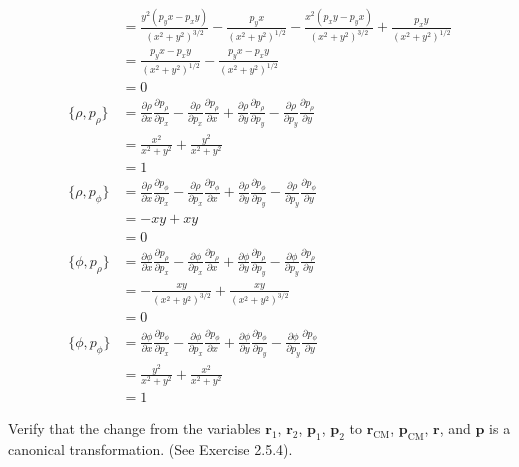 \documentclass[../principles-of-quantum-mechanics.tex]{subfiles}
\begin{document}
\begin{questions}
\begin{solution}
\begin{align*}
				&= \frac{y^2(p_yx - p_xy)}{(x^2+y^2)^{3/2}} - \frac{p_yx}{(x^2+y^2)^{1/2}} - \frac{x^2(p_xy - p_yx)}{(x^2+y^2)^{3/2}} + \frac{p_xy}{(x^2+y^2)^{1/2}} \\
				&= \frac{p_yx-p_xy}{(x^2+y^2)^{1/2}} - \frac{p_yx - p_xy}{(x^2+y^2)^{1/2}} \\
				&= 0 \\
				\{\rho, p_\rho\} &= \frac{\partial \rho}{\partial{x}}\frac{\partial p_\rho}{\partial p_x} - \frac{\partial \rho}{\partial{p_x}}\frac{\partial p_\rho}{\partial x} + \frac{\partial \rho}{\partial{y}}\frac{\partial p_\rho}{\partial p_y} - \frac{\partial \rho}{\partial{p_y}}\frac{\partial p_\rho}{\partial y} \\
				&= \frac{x^2}{x^2+y^2} + \frac{y^2}{x^2 + y^2} \\
				&= 1 \\
				\{\rho, p_\phi\} &= \frac{\partial \rho}{\partial{x}}\frac{\partial p_\phi}{\partial p_x} - \frac{\partial \rho}{\partial{p_x}}\frac{\partial p_\phi}{\partial x} + \frac{\partial \rho}{\partial{y}}\frac{\partial p_\phi}{\partial p_y} - \frac{\partial \rho}{\partial{p_y}}\frac{\partial p_\phi}{\partial y} \\
				&= -xy + xy \\
				&= 0 \\
				\{\phi, p_\rho\} &= \frac{\partial \phi}{\partial{x}}\frac{\partial p_\rho}{\partial p_x} - \frac{\partial \phi}{\partial{p_x}}\frac{\partial p_\rho}{\partial x} + \frac{\partial \phi}{\partial{y}}\frac{\partial p_\rho}{\partial p_y} - \frac{\partial \phi}{\partial{p_y}}\frac{\partial p_\rho}{\partial y} \\
				&= -\frac{xy}{(x^2+y^2)^{3/2}} + \frac{xy}{(x^2+y^2)^{3/2}} \\
				&= 0 \\
				\{\phi, p_\phi\} &= \frac{\partial \phi}{\partial{x}}\frac{\partial p_\phi}{\partial p_x} - \frac{\partial \phi}{\partial{p_x}}\frac{\partial p_\phi}{\partial x} + \frac{\partial \phi}{\partial{y}}\frac{\partial p_\phi}{\partial p_y} - \frac{\partial \phi}{\partial{p_y}}\frac{\partial p_\phi}{\partial y} \\
				&= \frac{y^2}{x^2+y^2} + \frac{x^2}{x^2+y^2} \\
				&= 1
			\end{align*}
		\end{solution}
		
		\question Verify that the change from the variables $\mathbf{r}_1$, $\mathbf{r}_2$, $\mathbf{p}_1$, $\mathbf{p}_2$ to $\mathbf{r}_{\text{CM}}$, $\mathbf{p}_{\text{CM}}$, $\mathbf{r}$, and $\mathbf{p}$ is a canonical transformation. (See Exercise 2.5.4).
		

\end{questions}
\end{document}
